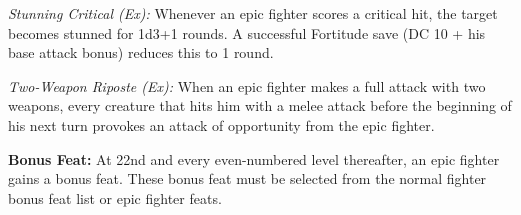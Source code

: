 \textit{Stunning Critical (Ex):} Whenever an epic fighter scores a critical hit, the target becomes stunned for 1d3+1 rounds. A successful Fortitude save (DC 10 + his base attack bonus) reduces this to 1 round.

\textit{Two-Weapon Riposte (Ex):} When an epic fighter makes a full attack with two weapons, every creature that hits him with a melee attack before the beginning of his next turn provokes an attack of opportunity from the epic fighter.


\textbf{Bonus Feat:} At 22nd and every even-numbered level thereafter, an epic fighter gains a bonus feat. These bonus feat must be selected from the normal fighter bonus feat list or epic fighter feats.
